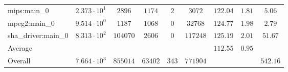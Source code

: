 \begin{tabular}{|l|c|c|c|c|c|c|c|c|}
mips:main\_0            & $ 2.373 \cdot 10^{1} $ & $ 2896   $ & $ 1174  $ & $ 2   $ & $ 3072   $ & $ 122.04      $ & $ 1.81    $ & $ 5.06    $ \\
mpeg2:main\_0           & $ 9.514 \cdot 10^{0} $ & $ 1187   $ & $ 1068  $ & $ 0   $ & $ 32768  $ & $ 124.77      $ & $ 1.98    $ & $ 2.79    $ \\
sha\_driver:main\_0     & $ 8.313 \cdot 10^{2} $ & $ 104070 $ & $ 2606  $ & $ 0   $ & $ 117248 $ & $ 125.19      $ & $ 2.01    $ & $ 51.67   $ \\
\hline
Average                 & $                    $ & $        $ & $       $ & $     $ & $        $ & $ 112.55      $ & $ 0.95    $ & $         $ \\
\hline
Overall                 & $ 7.664 \cdot 10^{3} $ & $ 855014 $ & $ 63402 $ & $ 343 $ & $ 771904 $ & $             $ & $         $ & $ 542.16  $ \\
\hline
\end{tabular}
